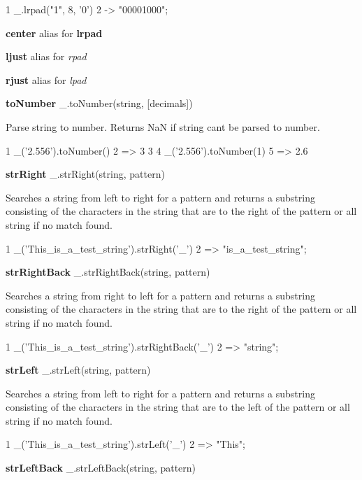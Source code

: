 \begin{DoxyCode}
1 \_.lrpad("1", 8, '0')
2 -> "00001000";
\end{DoxyCode}


{\bfseries center} alias for {\bfseries lrpad}

{\bfseries ljust} alias for {\itshape rpad}

{\bfseries rjust} alias for {\itshape lpad}

{\bfseries to\+Number} \+\_\+.\+to\+Number(string, \mbox{[}decimals\mbox{]})

Parse string to number. Returns Na\+N if string can\textquotesingle{}t be parsed to number.


\begin{DoxyCode}
1 \_('2.556').toNumber()
2 => 3
3 
4 \_('2.556').toNumber(1)
5 => 2.6
\end{DoxyCode}


{\bfseries str\+Right} \+\_\+.\+str\+Right(string, pattern)

Searches a string from left to right for a pattern and returns a substring consisting of the characters in the string that are to the right of the pattern or all string if no match found.


\begin{DoxyCode}
1 \_('This\_is\_a\_test\_string').strRight('\_')
2 => "is\_a\_test\_string";
\end{DoxyCode}


{\bfseries str\+Right\+Back} \+\_\+.\+str\+Right\+Back(string, pattern)

Searches a string from right to left for a pattern and returns a substring consisting of the characters in the string that are to the right of the pattern or all string if no match found.


\begin{DoxyCode}
1 \_('This\_is\_a\_test\_string').strRightBack('\_')
2 => "string";
\end{DoxyCode}


{\bfseries str\+Left} \+\_\+.\+str\+Left(string, pattern)

Searches a string from left to right for a pattern and returns a substring consisting of the characters in the string that are to the left of the pattern or all string if no match found.


\begin{DoxyCode}
1 \_('This\_is\_a\_test\_string').strLeft('\_')
2 => "This";
\end{DoxyCode}


{\bfseries str\+Left\+Back} \+\_\+.\+str\+Left\+Back(string, pattern)

